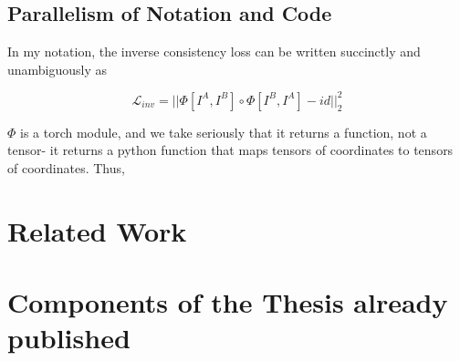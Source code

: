 \documentclass{article}
\begin{document}
\subsection{Parallelism of Notation and Code}

In my notation, the inverse consistency loss can be written succinctly and unambiguously as 

$$ \mathcal{L}_{inv} = ||\Phi[I^A, I^B] \circ \Phi[I^B, I^A] - id||^2_2$$

$\Phi$ is a torch module, and we take seriously that it returns a function, not a tensor- it returns a python function that maps tensors of coordinates to tensors of coordinates. Thus,  


\section{Related Work}



\cite{Mok_2020_CVPR, iglesias2023easyreg}


\section{Components of the Thesis already published}
\end{document}
